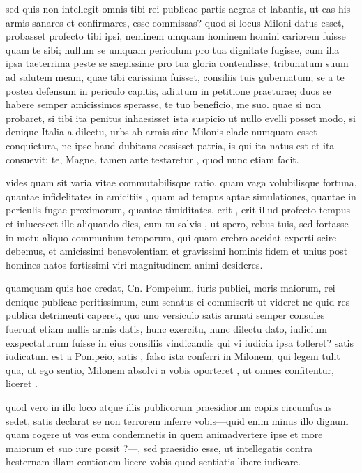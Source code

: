  sed quis non intellegit omnis tibi rei publicae partis aegras et labantis, ut eas his armis sanares et confirmares, esse commissas? quod si locus Miloni datus esset, probasset profecto tibi ipsi, neminem umquam hominem homini cariorem fuisse quam te sibi; nullum se umquam periculum pro tua dignitate fugisse, cum illa ipsa taeterrima peste se saepissime pro tua gloria contendisse; tribunatum suum ad salutem meam, quae tibi carissima fuisset, consiliis tuis gubernatum; se a te postea defensum in periculo capitis, adiutum in petitione praeturae; duos se habere semper amicissimos sperasse, te tuo beneficio, me suo. quae si non probaret, si tibi ita penitus inhaesisset ista suspicio ut nullo evelli posset modo, si denique Italia a dilectu, urbs ab armis sine Milonis clade numquam esset conquietura, ne ipse haud dubitans cessisset patria, is qui ita natus est et ita consuevit; te, Magne, tamen ante testaretur , quod nunc etiam facit.

 vides quam sit varia vitae commutabilisque ratio, quam vaga volubilisque fortuna, quantae infidelitates in amicitiis , quam ad tempus aptae simulationes, quantae in periculis fugae proximorum, quantae timiditates. erit , erit illud profecto tempus et inlucescet ille aliquando dies, cum tu salvis , ut spero, rebus tuis, sed fortasse in motu aliquo communium temporum, qui quam crebro accidat experti scire debemus, et amicissimi benevolentiam et gravissimi hominis fidem et unius post homines natos fortissimi viri magnitudinem animi desideres.

 quamquam quis hoc credat, Cn. Pompeium, iuris publici, moris maiorum, rei denique publicae peritissimum, cum senatus ei commiserit ut videret ne quid res publica detrimenti caperet, quo uno versiculo satis armati semper consules fuerunt etiam nullis armis datis, hunc exercitu, hunc dilectu dato, iudicium exspectaturum fuisse in eius consiliis vindicandis qui vi iudicia ipsa tolleret? satis iudicatum est a Pompeio, satis , falso ista conferri in Milonem, qui legem tulit qua, ut ego sentio, Milonem absolvi a vobis oporteret , ut omnes confitentur, liceret .

 quod vero in illo loco atque illis publicorum praesidiorum copiis circumfusus sedet, satis declarat se non terrorem inferre vobis—quid enim minus illo dignum quam cogere ut vos eum condemnetis in quem animadvertere ipse et more maiorum et suo iure possit ?—, sed praesidio esse, ut intellegatis contra hesternam illam contionem licere vobis quod sentiatis libere iudicare.

